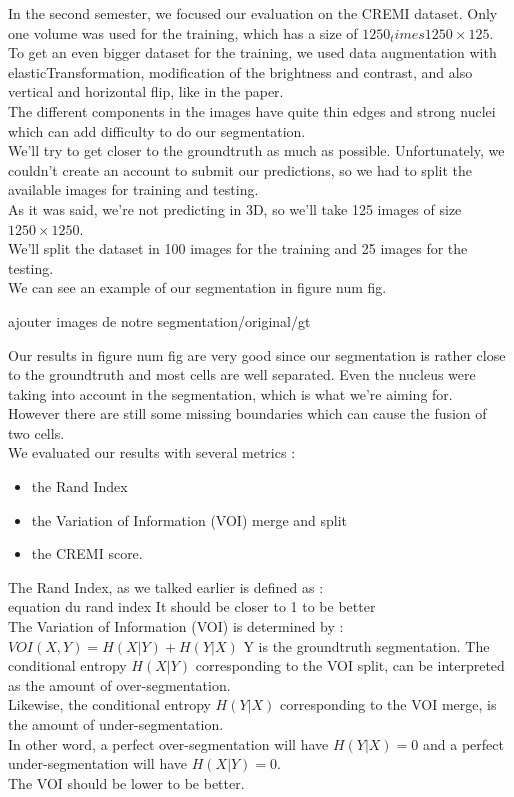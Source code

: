 In the second semester, we focused our evaluation on the CREMI dataset. Only one volume was used for the training, which has a size of $1250_times 1250\times 125$.\\
To get an even bigger dataset for the training, we used data augmentation with elasticTransformation, modification of the brightness and contrast, and also vertical and horizontal flip, like in the paper.\\
The different components in the images have quite thin edges and strong nuclei which can add difficulty to do our segmentation.\\
We’ll try to get closer to the groundtruth as much as possible. Unfortunately, we couldn’t create an account to submit our predictions, so we had to split the available images for training and testing.\\ 
As it was said, we’re not predicting in 3D, so we’ll take 125 images of size $1250\times 1250$.\\ 
We’ll split the dataset in 100 images for the training and 25 images for the testing.\\
We can see an example of our segmentation in figure {\color{red} num fig}.

{\color{red} ajouter images de notre segmentation/original/gt}

Our results in figure {\color{red} num fig} are very good since our segmentation is rather close to the groundtruth and most cells are well separated.
Even the nucleus were taking into account in the segmentation, which is what we're aiming for.\\
However there are still some missing boundaries which can cause the fusion of two cells.\\

We evaluated our results with several metrics :\\
\begin{itemize}
  \item the Rand Index
  \item the Variation of Information (VOI) merge and split
  \item the CREMI score.
\end{itemize}

The Rand Index, as we talked earlier is defined as :\\
{\color{red} equation du rand index}
It should be closer to 1 to be better\\

The Variation of Information (VOI) is determined by :\\
$VOI(X,Y) = H(X|Y) + H(Y|X)$
Y is the groundtruth segmentation.
The conditional entropy $H(X|Y)$ corresponding to the VOI split, can be interpreted as the amount of over-segmentation.\\
Likewise, the conditional entropy $H(Y|X)$ corresponding to the VOI merge, is the amount of under-segmentation.\\
In other word, a perfect over-segmentation will have $H(Y|X) = 0$ and a perfect under-segmentation will have $H(X|Y) = 0$.\\
The VOI should be lower to be better.\\

